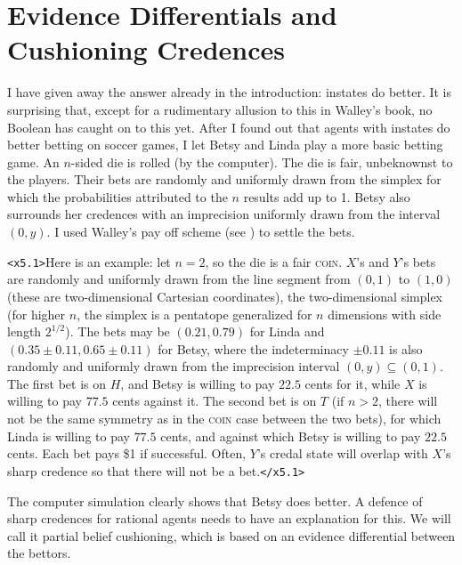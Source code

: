 \documentclass[11pt]{article}
\begin{document}
\section{Evidence Differentials and Cushioning Credences}
\label{WalleysWorldCupWoes}

I have given away the answer already in the introduction: instates do
better. It is surprising that, except for a rudimentary allusion to
this in Walley's book, no Boolean has caught on to this yet. After I
found out that agents with instates do better betting on soccer games,
I let Betsy and Linda play a more basic betting game. An $n$-sided die
is rolled (by the computer). The die is fair, unbeknownst to the
players. Their bets are randomly and uniformly drawn from the simplex
for which the probabilities attributed to the $n$ results add up to 1.
Betsy also surrounds her credences with an imprecision uniformly drawn
from the interval $(0,y)$. I used Walley's pay off scheme (see
) to settle the bets.

\texttt{<x5.1>}Here is an example: let $n=2$, so the die is a fair
\textsc{coin}. $X$'s and $Y$'s bets are randomly and uniformly drawn
from the line segment from $(0,1)$ to $(1,0)$ (these are
two-dimensional Cartesian coordinates), the two-dimensional simplex
(for higher $n$, the simplex is a pentatope generalized for $n$
dimensions with side length $2^{1/2}$). The bets may be $(0.21,0.79)$
for Linda and $(0.35\pm{}0.11,0.65\pm{}0.11)$ for Betsy, where the
indeterminacy $\pm{}0.11$ is also randomly and uniformly drawn from
the imprecision interval $(0,y)\subseteq(0,1)$. The first bet is on
$H$, and Betsy is willing to pay $22.5$ cents for it, while $X$ is
willing to pay $77.5$ cents against it. The second bet is on $T$ (if
$n>2$, there will not be the same symmetry as in the \textsc{coin}
case between the two bets), for which Linda is willing to pay $77.5$
cents, and against which Betsy is willing to pay $22.5$ cents. Each
bet pays \$1 if successful. Often, $Y$'s credal state will overlap
with $X$'s sharp credence so that there will not be a
bet.\texttt{</x5.1>}

The computer simulation clearly shows that Betsy does better. A
defence of sharp credences for rational agents needs to have an
explanation for this. We will call it partial belief cushioning, which
is based on an evidence differential between the bettors.
\end{document}
